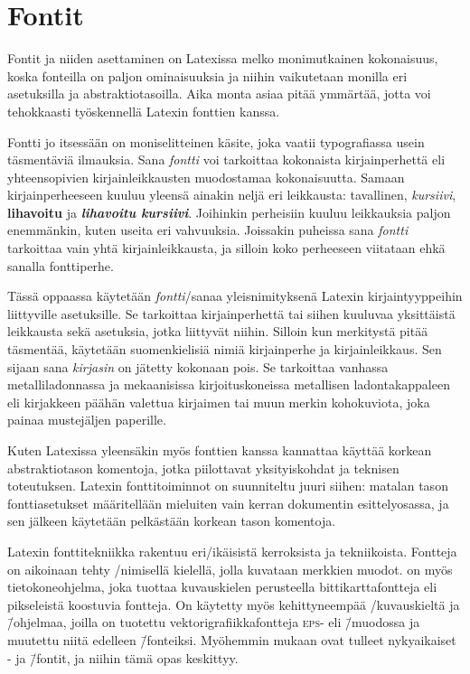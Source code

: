 \section{Fontit}
\label{luku:kirjaintyypit}

Fontit ja niiden asettaminen on Latexissa melko monimutkainen
kokonaisuus, koska fonteilla on paljon ominaisuuksia ja niihin
vaikutetaan monilla eri asetuksilla ja abstraktiotasoilla. Aika monta
asiaa pitää ymmärtää, jotta voi tehokkaasti työskennellä Latexin
fonttien kanssa.

Fontti jo itsessään on moniselitteinen käsite, joka vaatii typografiassa
usein täsmentäviä ilmauksia. Sana \emph{fontti} voi tarkoittaa
kokonaista kirjainperhettä eli yhteensopivien kirjainleikkausten
muodostamaa kokonaisuutta. Samaan kirjainperheeseen kuuluu yleensä
ainakin neljä eri leikkausta: tavallinen, \textit{kursiivi},
\textbf{lihavoitu} ja \textbf{\textit{lihavoitu kursiivi}}. Joihinkin
perheisiin kuuluu leikkauksia paljon enemmänkin, kuten useita eri
vahvuuksia. Joissakin puheissa sana \emph{fontti} tarkoittaa vain yhtä
kirjainleikkausta, ja silloin koko perheeseen viitataan ehkä sanalla
fonttiperhe.

Tässä oppaassa käytetään \emph{fontti}\-/sanaa yleisnimityksenä Latexin
kirjaintyyppeihin liittyville asetuksille. Se tarkoittaa kirjainperhettä
tai siihen kuuluvaa yksittäistä leikkausta sekä asetuksia, jotka
liittyvät niihin. Silloin kun merkitystä pitää täsmentää, käytetään
suomenkielisiä nimiä kirjainperhe ja kirjainleikkaus. Sen sijaan sana
\emph{kirjasin} on jätetty kokonaan pois. Se tarkoittaa vanhassa
metalliladonnassa ja mekaanisissa kirjoituskoneissa metallisen
ladontakappaleen eli kirjakkeen päähän valettua kirjaimen tai muun
merkin kohokuviota, joka painaa mustejäljen paperille.

Kuten Latexissa yleensäkin myös fonttien kanssa kannattaa käyttää
korkean abstraktiotason komentoja, jotka piilottavat yksityiskohdat ja
teknisen toteutuksen. Latexin fonttitoiminnot on suunniteltu juuri
siihen: matalan tason fonttiasetukset määritellään mieluiten vain kerran
dokumentin esittelyosassa, ja sen jälkeen käytetään pelkästään korkean
tason komentoja.

Latexin fonttitekniikka rakentuu eri\-/ikäisistä kerroksista ja
tekniikoista. Fontteja on aikoinaan tehty
\-/nimisellä kielellä, jolla
kuvataan merkkien muodot.  on myös tietokoneohjelma,
joka tuottaa kuvauskielen perusteella bittikarttafontteja eli
pikseleistä koostuvia fontteja. On käytetty myös kehittyneempää
\-/kuvauskieltä ja \=/ohjelmaa,
joilla on tuotettu vektorigrafiikkafontteja \textsc{eps}- eli
 \=/muodossa ja muutettu niitä
edelleen  \=/fonteiksi. Myöhemmin mukaan
ovat tulleet nykyaikaiset - ja 
\=/fontit, ja niihin tämä opas keskittyy.

